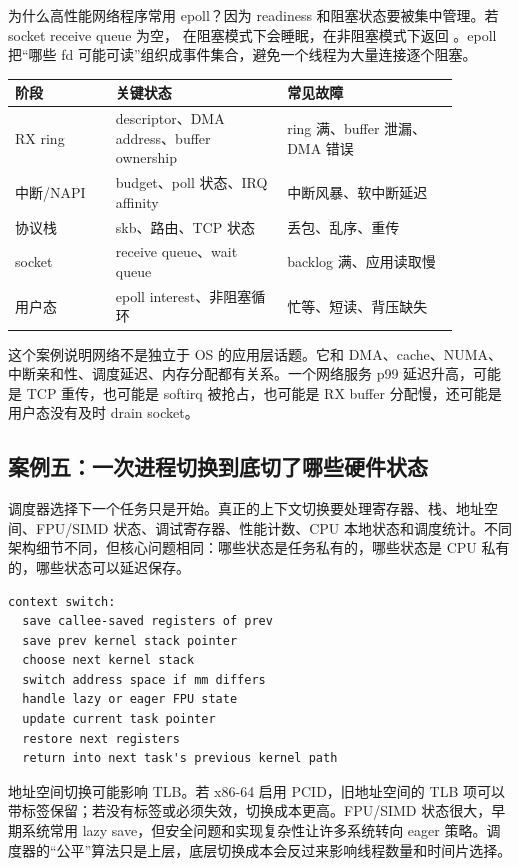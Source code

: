 为什么高性能网络程序常用 epoll？因为 readiness 和阻塞状态要被集中管理。若 socket receive queue 为空， 在阻塞模式下会睡眠，在非阻塞模式下返回 。epoll 把“哪些 fd 可能可读”组织成事件集合，避免一个线程为大量连接逐个阻塞。

\begin{longtable}{p{0.2\linewidth}p{0.34\linewidth}p{0.34\linewidth}}
\toprule
阶段 & 关键状态 & 常见故障 \\
\midrule
RX ring & descriptor、DMA address、buffer ownership & ring 满、buffer 泄漏、DMA 错误 \\
中断/NAPI & budget、poll 状态、IRQ affinity & 中断风暴、软中断延迟 \\
协议栈 & skb、路由、TCP 状态 & 丢包、乱序、重传 \\
socket & receive queue、wait queue & backlog 满、应用读取慢 \\
用户态 & epoll interest、非阻塞循环 & 忙等、短读、背压缺失 \\
\bottomrule
\end{longtable}

这个案例说明网络不是独立于 OS 的应用层话题。它和 DMA、cache、NUMA、中断亲和性、调度延迟、内存分配都有关系。一个网络服务 p99 延迟升高，可能是 TCP 重传，也可能是 softirq 被抢占，也可能是 RX buffer 分配慢，还可能是用户态没有及时 drain socket。

\subsection{案例五：一次进程切换到底切了哪些硬件状态}

调度器选择下一个任务只是开始。真正的上下文切换要处理寄存器、栈、地址空间、FPU/SIMD 状态、调试寄存器、性能计数、CPU 本地状态和调度统计。不同架构细节不同，但核心问题相同：哪些状态是任务私有的，哪些状态是 CPU 私有的，哪些状态可以延迟保存。

\begin{lstlisting}
context switch:
  save callee-saved registers of prev
  save prev kernel stack pointer
  choose next kernel stack
  switch address space if mm differs
  handle lazy or eager FPU state
  update current task pointer
  restore next registers
  return into next task's previous kernel path
\end{lstlisting}

地址空间切换可能影响 TLB。若 x86-64 启用 PCID，旧地址空间的 TLB 项可以带标签保留；若没有标签或必须失效，切换成本更高。FPU/SIMD 状态很大，早期系统常用 lazy save，但安全问题和实现复杂性让许多系统转向 eager 策略。调度器的“公平”算法只是上层，底层切换成本会反过来影响线程数量和时间片选择。

